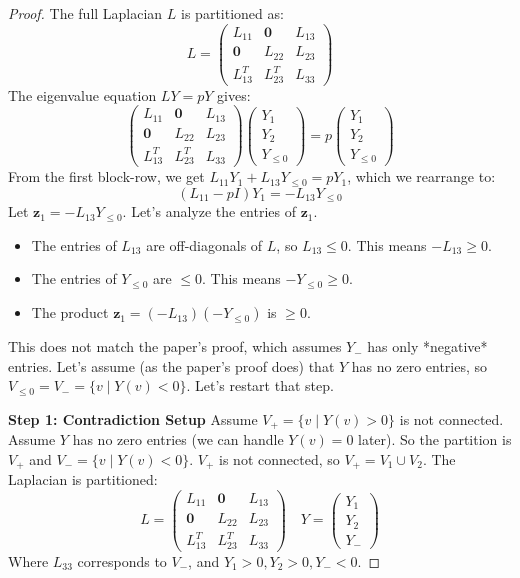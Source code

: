 \documentclass[12pt,a4paper]{report}
\theoremstyle{plain}
\theoremstyle{definition}
\theoremstyle{remark}
\begin{document}
\begin{proof}
The full Laplacian $L$ is partitioned as:
$$ L = \begin{pmatrix} L_{11} & \mathbf{0} & L_{13} \\ \mathbf{0} & L_{22} & L_{23} \\ L_{13}^T & L_{23}^T & L_{33} \end{pmatrix} $$
The eigenvalue equation $LY = pY$ gives:
$$ \begin{pmatrix} L_{11} & \mathbf{0} & L_{13} \\ \mathbf{0} & L_{22} & L_{23} \\ L_{13}^T & L_{23}^T & L_{33} \end{pmatrix} \begin{pmatrix} Y_1 \\ Y_2 \\ Y_{\le 0} \end{pmatrix} = p \begin{pmatrix} Y_1 \\ Y_2 \\ Y_{\le 0} \end{pmatrix} $$
From the first block-row, we get $L_{11}Y_1 + L_{13}Y_{\le 0} = pY_1$, which we rearrange to:
$$ (L_{11} - pI)Y_1 = -L_{13}Y_{\le 0} $$
Let $\bm{z}_1 = -L_{13}Y_{\le 0}$. Let's analyze the entries of $\bm{z}_1$.
\begin{itemize}
    \item The entries of $L_{13}$ are off-diagonals of $L$, so $L_{13} \le 0$. This means $-L_{13} \ge 0$.
    \item The entries of $Y_{\le 0}$ are $\le 0$. This means $-Y_{\le 0} \ge 0$.
    \item The product $\bm{z}_1 = (-L_{13})(-Y_{\le 0})$ is $\ge 0$.
\end{itemize}
This does not match the paper's proof, which assumes $Y_-$ has only *negative* entries. Let's assume (as the paper's proof does) that $Y$ has no zero entries, so $V_{\le 0} = V_- = \{v \mid Y(v) < 0\}$.
Let's restart that step.

\textbf{Step 1: Contradiction Setup}
Assume $V_+ = \{v \mid Y(v) > 0\}$ is not connected.
Assume $Y$ has no zero entries (we can handle $Y(v)=0$ later). So the partition is $V_+$ and $V_- = \{v \mid Y(v) < 0\}$.
$V_+$ is not connected, so $V_+ = V_1 \cup V_2$.
The Laplacian is partitioned:
$$ L = \begin{pmatrix} L_{11} & \mathbf{0} & L_{13} \\ \mathbf{0} & L_{22} & L_{23} \\ L_{13}^T & L_{23}^T & L_{33} \end{pmatrix} \quad Y = \begin{pmatrix} Y_1 \\ Y_2 \\ Y_{-} \end{pmatrix} $$
Where $L_{33}$ corresponds to $V_-$, and $Y_1 > 0, Y_2 > 0, Y_- < 0$.


\end{proof}
\end{document}
